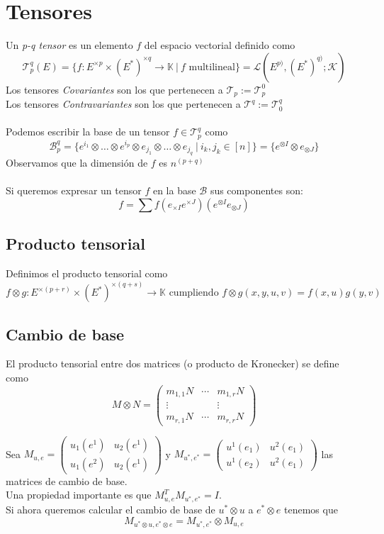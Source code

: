 \documentclass[leqno]{article}
\newcommand{\T}{\mathcal{T}}
\newcommand{\st}{\ | \ }
\begin{document}
\section{Tensores}
Un \textit{p-q tensor} es un elemento $f$ del espacio vectorial definido como
$$
\boxed{\T_p^q(E)=\{ f: E^{\times p}\times (E^*)^{\times q} \to \mathbb{K} \st f \text{ multilineal}\} = \mathcal{L}(E^{p)}, (E^*)^{q)};\mathcal{K})}
$$
Los tensores \textit{Covariantes} son los que pertenecen a $\T_p:=\T_p^0$ \\
Los tensores \textit{Contravariantes} son los que pertenecen a $\T^q:=\T_0^q$ \\
\\
Podemos escribir la base de un tensor $f\in \T_p^q$ como
$$
\mathcal{B}_p^q=\{e^{i_1}\otimes \ldots \otimes e^{i_p}\otimes e_{j_1}\otimes \ldots \otimes e_{j_q} \st i_k, j_k\in [n]\} = \{e^{\otimes I}\otimes e_{\otimes J}\}
$$
Observamos que la dimensión de $f$ es $n^{(p+q)}$\\
\\
Si queremos expresar un tensor $f$ en la base $\mathcal{B}$ sus componentes son:
\[
  f= \sum f(e_{\times I}e^{\times J})(e^{\otimes I}e_{\otimes J})
\] 

\subsection{Producto tensorial}
Definimos el producto tensorial como
$$
f\otimes g:E^{\times(p+r)}\times (E^*)^{\times(q+s)} \to \mathbb{K} \text{ cumpliendo } \boxed{f\otimes g (x, y, u, v) = f(x, u)g(y,v)  }  
$$

\subsection{Cambio de base}
El producto tensorial entre dos matrices (o producto de Kronecker) se define como
$$
M\otimes N = \begin{pmatrix}
m_{1,1}N & \cdots & m_{1,r}N\\
\vdots &  & \vdots \\
m_{r,1}N & \cdots & m_{r,r}N
\end{pmatrix}
$$

Sea $M_{u, e} = \begin{pmatrix}
u_1(e^1) & u_2(e^1) \\
u_1(e^2) & u_2(e^1)
\end{pmatrix}$ y $M_{u^*, e^*} = \begin{pmatrix}
u^1(e_1) & u^2(e_1) \\
u^1(e_2) & u^2(e_1)
\end{pmatrix}$ las matrices de cambio de base.\\
Una propiedad importante es que $M_{u, e}^TM_{u^*, e^*} = I$.
\\
Si ahora queremos calcular el cambio de base de $u^*\otimes u$ a $e^*\otimes e$ tenemos que
$$
M_{u^*\otimes u, e^*\otimes e} = M_{u^*, e^*}\otimes M_{u,e}
$$
\end{document}
